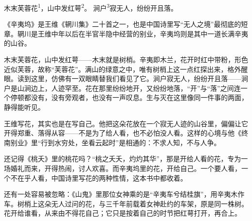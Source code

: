 
\begin{poem}
木末芙蓉花\textsuperscript{1}，山中发红萼\textsuperscript{2}。
涧户\textsuperscript{3}寂无人，纷纷开且落。
\end{poem}

\begin{annotations}
\end{annotations}

\begin{appreciation}
《辛夷坞》是王维《辋川集》二十首之一，也是中国诗里写“无人之境”最彻底的短章。辋川是王维中年以后在半官半隐中经营的别业，辛夷坞则是其中一道长满辛夷的山谷。

木末芙蓉花，山中发红萼——木末就是树梢。辛夷即木兰，花开时红中带粉，形色近似芙蓉，故称“芙蓉花”。满山的绿意之中，唯有树梢上这一点红探出来，格外醒眼。读到这里，仿佛有一双眼睛替我们看见了它。涧户寂无人，纷纷开且落——涧户是山涧边上，人迹罕至。花在那里纷纷地开，又纷纷地落，“开”与“落”之间连一个停顿都没有，没有旁观者，也没有一声叹息。生与灭在这里像同一件事的两面，静得能听见。

王维写花，其实也是在写自己。他把这朵花放在一个寂无人迹的山谷里，偏偏让它开得郑重、落得从容——不是为了给人看，也不必怕没人看。这样的心境与他《终南别业》里“行到水穷处，坐看云起时”是相通的：不求人知，不与人争。

还记得《桃夭》里的桃花吗？“桃之夭夭，灼灼其华”，那是开给人看的花，专为一场婚礼而来，开得热闹，讨人欢喜。而辛夷坞里的花，开给自己。一个要人看，一个不在乎人看，中国诗里写花的两种性情，这本书中都收着。

还有一处容易被忽略：《山鬼》里那位女神乘的是“辛夷车兮结桂旗”，用辛夷木作车。树梢上这朵无人过问的花，与三千年前载着女神赴约的车架，原是同一株树。花开给谁看，从来由不得花自己；它只是按着自己的时节把红萼打开，再合上。
\end{appreciation}
